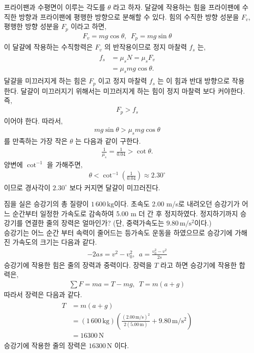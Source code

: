 \documentclass[floatfix,nofootinbib,superscriptaddress,fleqn,preprint]{revtex4}
\begin{document}
프라이팬과 수평면이 이루는 각도를 $\theta$ 라고 하자. 달걀에 작용하는 힘을
프라이팬에 수직한 방향과 프라이팬에 평행한 방향으로 분해할 수 있다. 힘의 수직한
방향 성분을 $F_v$, 평행한 방향 성분을 $F_p$ 이라고 하면,
\begin{align}
F_v = mg\cos{\theta},\,\,\,F_p = mg\sin{\theta}  
\end{align} 
이 달걀에 작용하는 수직항력은 $F_v$ 의 반작용이므로 정지 마찰력 $f_s$ 는,
\begin{align}
  \begin{split}
    f_s &= \mu_s N = \mu_s F_v \\
    &= \mu_s mg\cos{\theta}.
  \end{split}
\end{align} 
달걀을 미끄러지게 하는 힘은 $F_p$ 이고 정지 마찰력 $f_s$ 는 이 힘과 반대 방향으로
작용한다. 달걀이 미끄러지기 위해서는 미끄러지게 하는 힘이 정지 마찰력 보다 커야한다. 즉,
\begin{align}
  F_p > f_s
\end{align}
이어야 한다. 따라서,
\begin{align}
  mg\sin{\theta}  > \mu_s mg\cos{\theta}
\end{align}
를 만족하는 가장 작은 $\theta$ 는 다음과 같이 구한다.
\begin{align}
  \frac{1}{\mu_s} = \frac{1}{0.04} > \cot{\theta} .
\end{align}
양변에 $\cot^{-1}$ 을 가해주면,
  \begin{align}
  \theta < \cot^{-1}{\left(\frac{1}{0.04}\right)} \approx 2.30^\circ
\end{align}
이므로 경사각이 $2.30^\circ$ 보다 커지면 달걀이 미끄러진다.
\vspace{2cm}

짐을 실은 승강기의 총 질량이 
$1\,600\,\mathrm{kg}$이다. 초속도 2.00 m/s로 내려오던 승강기가 어느
순간부터 일정한 가속도로 감속하여 5.00 m 더 간 후
정지하였다. 정지하기까지 승강기를 연결한 줄의 장력은 얼마인가? (단,
중력가속도는 $9.80\,\mathrm{m/s^2}$이다.)   \\

승강기는 어느 순간 부터 속력이 줄어드는 등가속도 운동을 하였으므로
 승강기에 가해진 가속도의 크기는 다음과 같다.
\begin{align}
  -2as = v^2-v_0^2,\,\,\, a = \frac{v_0^2-v^2}{2s}
\end{align}
승강기에 작용한 힘은 줄의 장력과 중력이다. 장력을 $T$ 라고 하면
 승강기에 작용한 합력은,
\begin{align}
  \sum F = ma = T-mg,\,\,\, T = m(a+g)
\end{align}
따라서 장력은 다음과 같다.
\begin{align}
  \begin{split}
    T  &= m(a+g)  \\ 
    &= (1\,600\,\mathrm{kg})\left(\frac{(2.00\,\mathrm{m/s})^2}
    {2(5.00\,\mathrm{m})}+9.80\,\mathrm{m/s^2}\right) \\
    &=16300\,\mathrm{N}
  \end{split}
\end{align}
승강기에 작용한 줄의 장력은 $16300\,\mathrm{N}$ 이다.
\end{document}
